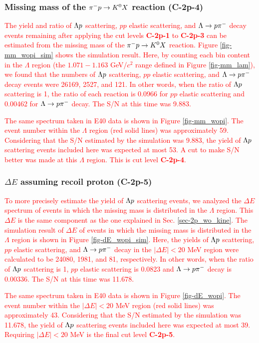 \subsubsection{Missing mass of the $\pi^- p \to K^0 X$ reaction ({\bf C-2p-4})}

\textcolor{red}{ The yield and ratio of $\Lambda p$ scattering, $pp$ elastic scattering, and $\Lambda\to p\pi^{-}$ decay events remaining after applying the cut levels {\bf C-2p-1} to {\bf C-2p-3} can be estimated from the missing mass of the $\pi^- p \to K^0 X$ reaction. Figure \ref{fig-mm_wopi_sim} shows the simulation result. Here, by counting each bin content in the $\Lambda$ region (the $1.071-1.163$ GeV/$c^{2}$ range defined in Figure \ref{fig-mm_lam}), we found that the numbers of $\Lambda p$ scattering, $pp$ elastic scattering, and $\Lambda\to p\pi^{-}$ decay events were 26169, 2527, and 121. In other words, when the ratio of $\Lambda p$ scattering is 1, the ratio of each reaction is 0.0966 for $pp$ elastic scattering and 0.00462 for $\Lambda\to p\pi^{-}$ decay. The S/N at this time was 9.883. }

\textcolor{red}{ The same spectrum taken in E40 data is shown in Figure \ref{fig-mm_wopi}. The event number within the $\Lambda$ region (red solid lines) was approximately 59. Considering that the S/N estimated by the simulation was 9.883, the yield of $\Lambda p$ scattering events included here was expected at most 53. A cut to make S/N better was made at this $\Lambda$ region. This is cut level {\bf C-2p-4}.}

\subsubsection{$\Delta E$ assuming recoil proton ({\bf C-2p-5})}

\textcolor{red}{ To more precisely estimate the yield of $\Lambda p$ scattering events, we analyzed the $\Delta E$ spectrum of events in which the missing mass is distributed in the $\Lambda$ region.
This $\Delta E$ is the same component as the one explained in Sec. \ref{sec-2p_wo_kine}.
The simulation result of $\Delta E$ of events in which the missing mass is distributed in the $\Lambda$ region is shown in Figure \ref{fig-dE_wopi_sim}. Here, the yields of $\Lambda p$ scattering, $pp$ elastic scattering, and $\Lambda\to p\pi^{-}$ decay in the $|\Delta E|<20$ MeV region were calculated to be 24080, 1981, and 81, respectively. In other words, when the ratio of $\Lambda p$ scattering is 1, $pp$ elastic scattering is 0.0823 and $\Lambda\to p\pi^{-}$ decay is 0.00336. The S/N at this time was 11.678. }

\textcolor{red}{ The same spectrum taken in E40 data is shown in Figure \ref{fig-dE_wopi}. The event number within the $|\Delta E|<20$ MeV region (red solid lines) was approximately 43. Considering that the S/N estimated by the simulation was 11.678, the yield of $\Lambda p$ scattering events included here was expected at most 39. Requiring $|\Delta E|<20$ MeV is the final cut level {\bf C-2p-5}.}

